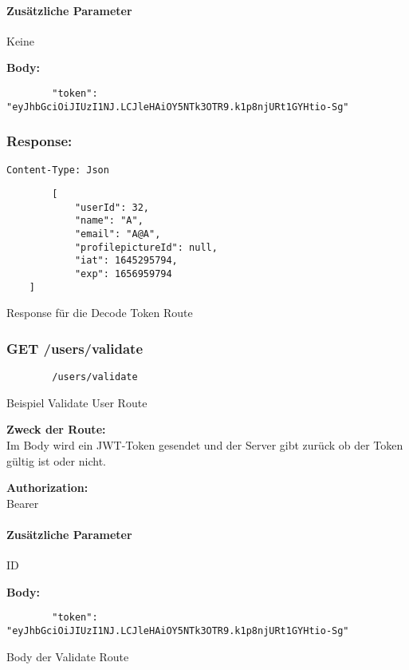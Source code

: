\paragraph{Zusätzliche Parameter}
Keine

\textbf{Body:}


\begin{lstlisting}
        "token": "eyJhbGciOiJIUzI1NJ.LCJleHAiOY5NTk3OTR9.k1p8njURt1GYHtio-Sg"
    \end{lstlisting}

\subsubsection{Response:}

\begin{code}
    \lstinline{Content-Type: Json}
    \begin{lstlisting}
        [
            "userId": 32,
            "name": "A",
            "email": "A@A",
            "profilepictureId": null,
            "iat": 1645295794,
            "exp": 1656959794
    ]
    \end{lstlisting}
    \caption{Response für die Decode Token Route}
\end{code}

\pagebreak

\subsubsection{GET /users/validate}

\begin{code}
    \begin{lstlisting}
        /users/validate
    \end{lstlisting}
    \caption{Beispiel Validate User Route}
\end{code}

\textbf{Zweck der Route:} \\
Im Body wird ein JWT-Token gesendet und der Server gibt zurück ob der Token
gültig ist oder nicht.

\textbf{Authorization:} \\
Bearer

\paragraph{Zusätzliche Parameter}
ID

\textbf{Body:}
\begin{code}
    \begin{lstlisting}
        "token": "eyJhbGciOiJIUzI1NJ.LCJleHAiOY5NTk3OTR9.k1p8njURt1GYHtio-Sg"
    \end{lstlisting}
    \caption{Body der Validate Route}
\end{code}


